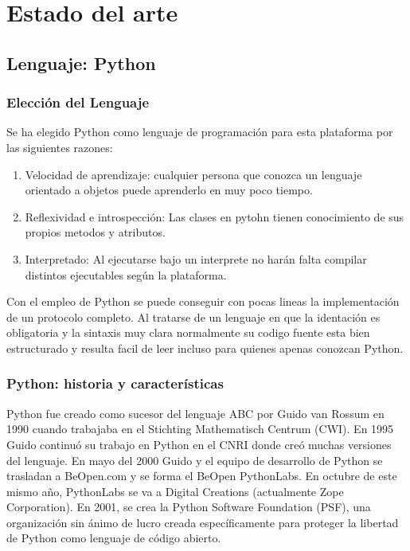 \documentclass[a4paper,spanish,12pt]{book}
\begin{document}
\chapter{Estado del arte}

\section{Lenguaje: Python}
\subsection{Elecci\'on del Lenguaje} 
Se ha elegido Python como lenguaje de programaci\'on para esta plataforma por las siguientes razones:
\begin{enumerate}
	\item Velocidad de aprendizaje: cualquier persona que conozca un lenguaje orientado a objetos puede aprenderlo en muy poco tiempo.
	\item Reflexividad e introspección: Las clases en pytohn tienen conocimiento de sus propios metodos y atributos.
	\item Interpretado: Al ejecutarse bajo un interprete no har\'an falta compilar distintos ejecutables seg\'un la plataforma.
\end{enumerate}

Con el empleo de Python se puede conseguir con pocas lineas la implementaci\'on de un protocolo completo. Al tratarse de un lenguaje en que la identaci\'on es obligatoria y la sintaxis muy clara normalmente su codigo fuente esta bien estructurado y resulta facil de leer incluso para quienes apenas conozcan Python.

\subsection{Python: historia y características}

Python fue creado como sucesor del lenguaje ABC por Guido van Rossum en 1990 cuando trabajaba en el Stichting Mathematisch Centrum (CWI). En 1995 Guido continuó su trabajo en Python en el CNRI donde creó muchas versiones del lenguaje. En mayo del 2000 Guido y el equipo de desarrollo de Python se trasladan a BeOpen.com y se forma el BeOpen PythonLabs. En octubre de este mismo año, PythonLabs se va a Digital Creations (actualmente Zope Corporation). En 2001, se crea la Python Software Foundation (PSF), una organización sin ánimo de lucro creada específicamente para proteger la libertad de Python como lenguaje de código abierto.
\end{document}

